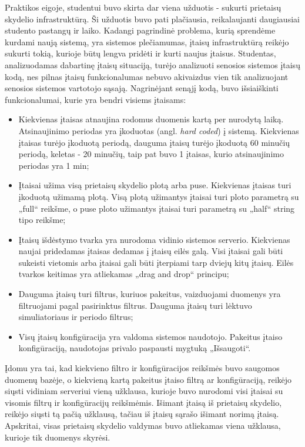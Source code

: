 \documentclass{VUMIFPSbakalaurinis}
\begin{document}
Praktikos eigoje, studentui buvo skirta dar viena užduotis - sukurti prietaisų skydelio infrastruktūrą. Ši užduotis buvo pati plačiausia, reikalaujanti daugiausiai studento pastangų ir laiko. Kadangi pagrindinė problema, kurią sprendėme kurdami naują sistemą, yra sistemos plečiamumas, įtaisų infrastruktūrą reikėjo sukurti tokią, kurioje būtų lengva pridėti ir kurti naujus įtaisus. Studentas, analizuodamas dabartinę įtaisų situaciją, turėjo analizuoti senosios sistemos įtaisų kodą, nes pilnas įtaisų funkcionalumas nebuvo akivaizdus vien tik analizuojant senosios sistemos vartotojo sąsają. Nagrinėjant senąjį kodą, buvo išsiaiškinti funkcionalumai, kurie yra bendri visiems įtaisams:
\begin{itemize}
    \item Kiekvienas įtaisas atnaujina rodomus duomenis kartą per nurodytą laiką. Atsinaujinimo periodas yra įkoduotas (angl. \textit{hard coded}) į sistemą. Kiekvienas įtaisas turėjo įkoduotą periodą, dauguma įtaisų turėjo įkoduotą 60 minučių periodą, keletas - 20 minučių, taip pat buvo 1 įtaisas, kurio atsinaujinimo periodas yra 1 min;
    \item Įtaisai užima visą prietaisų skydelio plotą arba puse. Kiekvienas įtaisas turi įkoduotą užimamą plotą. Visą plotą užimantys įtaisai turi ploto parametrą su „full“ reikšme, o puse ploto užimantys įtaisai turi parametrą su „half“ string tipo reikšme;
    \item Įtaisų išdėstymo tvarka yra nurodoma vidinio sistemos serverio. Kiekvienas naujai pridedamas įtaisas dedamas į įtaisų eilės galą. Visi įtaisai gali būti sukeisti vietomis arba įtaisai gali būti įterpiami tarp dviejų kitų įtaisų. Eilės tvarkos keitimas yra atliekamas „drag and drop“ principu;
    \item Dauguma įtaisų turi filtrus, kuriuos pakeitus, vaizduojami duomenys yra filtruojami pagal pasirinktus filtrus. Dauguma įtaisų turi lėktuvo simuliatoriaus ir periodo filtrus;
    \item Visų įtaisų konfigūracija yra valdoma sistemos naudotojo. Pakeitus įtaiso konfigūraciją, naudotojas privalo paspausti mygtuką „Išsaugoti“. 
\end{itemize}

Įdomu yra tai, kad kiekvieno filtro ir konfigūracijos reikšmės buvo saugomos duomenų bazėje, o kiekvieną kartą pakeitus įtaiso filtrą ar konfigūraciją, reikėjo siųsti vidiniam serveriui vieną užklausa, kurioje buvo nurodomi visi įtaisai su visomis filtrų ir konfigūracijų reikšmėmis. Išimant įtaisą iš prietaisų skydelio, reikėjo siųsti tą pačią užklausą, tačiau iš įtaisų sąrašo išimant norimą įtaisą. Apskritai, visas prietaisų skydelio valdymas buvo atliekamas viena užklausa, kurioje tik duomenys skyrėsi.
\end{document}
